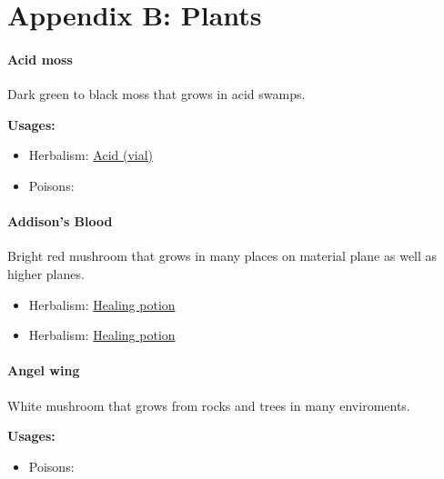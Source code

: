 \chapter*{Appendix B: Plants}

\subsubsection{Acid moss}
\label{acid_moss}

Dark green to black moss that grows in acid swamps.

\vspace{5mm}

\textbf{Usages:}

\begin{itemize}[noitemsep]
\item[] Herbalism: \hyperref[acid_vial]{Acid (vial)}
\item[] Poisons: \poison
\end{itemize}

\subsubsection{Addison's Blood}
\label{addisons_blood}

Bright red mushroom that grows in many places on material plane as well as higher planes.

\begin{itemize}[noitemsep]
\item[] Herbalism: \hyperref[healing_potion]{Healing potion}
\end{itemize}

\begin{itemize}[noitemsep]
\item[] Herbalism: \hyperref[healing_potion]{Healing potion}
\end{itemize}

\subsubsection{Angel wing}
\label{Angel wing}

White mushroom that grows from rocks and trees in many enviroments.

\vspace{5mm}

\textbf{Usages:}

\begin{itemize}[noitemsep]
\item[] Poisons: \poison
\end{itemize}

